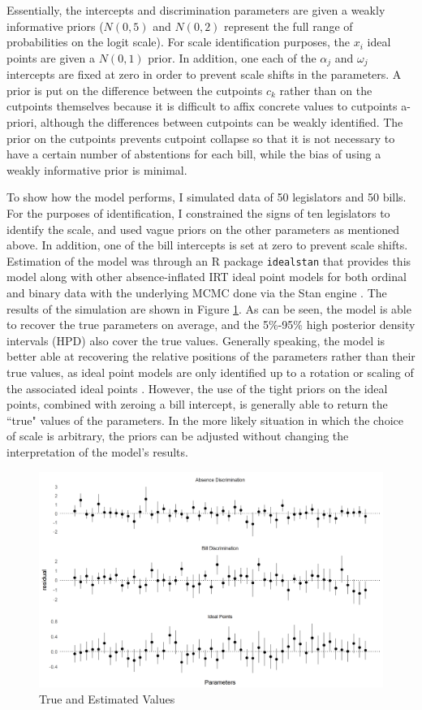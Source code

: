 	
	Essentially, the intercepts and discrimination parameters are given a weakly informative priors ($N(0,5)$ and $N(0,2)$ represent the full range of probabilities on the logit scale). For scale identification purposes, the $x_i$ ideal points are given a $N(0,1)$ prior. In addition, one each of the $\alpha_j$ and $\omega_j$ intercepts are fixed at zero in order to prevent scale shifts in the parameters. A prior is put on the difference between the cutpoints $c_k$ rather than on the cutpoints themselves because it is difficult to affix concrete values to cutpoints a-priori, although the differences between cutpoints can be weakly identified. The prior on the cutpoints prevents cutpoint collapse so that it is not necessary to have a certain number of abstentions for each bill, while the bias of using a weakly informative prior is minimal.
	
	To show how the model performs, I simulated data of 50 legislators and 50 bills. For the purposes of identification, I constrained the signs of ten legislators to identify the scale, and used vague priors on the other parameters as mentioned above. In addition, one of the bill intercepts is set at zero to prevent scale shifts. Estimation of the model was through an R package \texttt{idealstan} that provides this model along with other absence-inflated IRT ideal point models for both ordinal and binary data with the underlying MCMC done via the Stan engine \parencite{carpenter2017}. The results of the simulation are shown in Figure \ref{sim_results}. As can be seen, the model is able to recover the true parameters on average, and the 5\%-95\% high posterior density intervals (HPD) also cover the true values. Generally speaking, the model is better able at recovering the relative positions of the parameters rather than their true values, as ideal point models are only identified up to a rotation or scaling of the associated ideal points \parencite{gelman2005}. However, the use of the tight priors on the ideal points, combined with zeroing a bill intercept, is generally able to return the ``true" values of the parameters. In the more likely situation in which the choice of scale is arbitrary, the priors can be adjusted without changing the interpretation of the model's results. 
	
	\begin{figure}
		\caption{True and Estimated Values}\label{sim_results}
		\includegraphics[width=\linewidth]{param_resid}
	\end{figure} 
	
